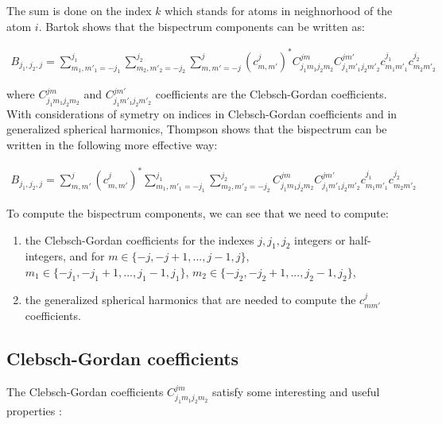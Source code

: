 \documentclass[12pt]{article}
\begin{document}
The sum is done on the index $k$ which stands for atoms in neighnorhood of the atom $i$.
Bartok \cite{Bartok_01} shows that the bispectrum components can be written as:

\begin{align}
B_{j_1,j_2,j}=\sum_{m_1,m'_1=-j_1}^{j_1} \sum_{m_2,m'_2=-j_2}^{j_2} \sum_{m,m'=-j}^{j} \left(c_{m,m'}^j\right)^\ast C^{j m}_{j_1 m_1 j_2 m_2}  C^{j m'}_{j_1 m'_1 j_2 m'_2} c^{j_1}_{m_1 m'_1} c^{j_2}_{m_2 m'_2}
\end{align}

where $C^{j m}_{j_1 m_1 j_2 m_2}$ and $C^{j m'}_{j_1 m'_1 j_2 m'_2}$ coefficients are the Clebsch-Gordan coefficients. \\

With considerations of symetry on indices in Clebsch-Gordan coefficients and in generalized spherical harmonics, Thompson \cite{Thompson_01} shows that the bispectrum can be written in the following more effective way:

\begin{eqnarray} \label{eqn:thompson_bs}
B_{j_1,j_2,j}=\sum_{m,m'}^j \left(c_{m,m'}^j\right)^\ast \sum_{m_1,m'_1=-j_1}^{j_1} \sum_{m_2,m'_2=-j_2}^{j_2} C^{j m}_{j_1 m_1 j_2 m_2}  C^{j m'}_{j_1 m'_1 j_2 m'_2} c^{j_1}_{m_1 m'_1} c^{j_2}_{m_2 m'_2}
\end{eqnarray}

To compute the bispectrum components, we can see that we need to compute:

\begin{enumerate}
	\item the Clebsch-Gordan coefficients for the indexes $j,j_1,j_2$ integers or half-integers, and for $m \in \{-j,-j+1,...,j-1,j\}$, $m_1 \in \{-j_1,-j_1+1,...,j_1-1,j_1\}$, $m_2 \in \{-j_2,-j_2+1,...,j_2-1,j_2\}$,
	\item the generalized spherical harmonics that are needed to compute the $c^j_{mm'}$ coefficients.
\end{enumerate}

 \subsection{Clebsch-Gordan coefficients}

The Clebsch-Gordan coefficients \cite{Caola_01} $C^{j m}_{j_1 m_1 j_2 m_2}$ satisfy some interesting and useful properties \cite{MW}: 
\end{document}
